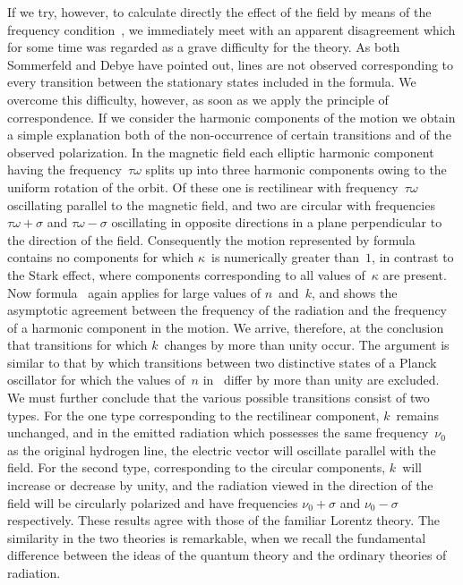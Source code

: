 If we try, however, to calculate directly the effect of the field by
means of the frequency condition~, we immediately meet with
an apparent disagreement which for some time was regarded as a
grave difficulty for the theory. As both Sommerfeld and Debye
have pointed out, lines are not observed corresponding to every
transition between the stationary states included in the formula.
We overcome this difficulty, however, as soon as we apply the
principle of correspondence. If we consider the harmonic components
of the motion we obtain a simple explanation both of the
non-occurrence of certain transitions and of the observed polarization.
In the magnetic field each elliptic harmonic component having
the frequency~$\tau\omega$ splits up into three harmonic components owing
to the uniform rotation of the orbit. Of these one is rectilinear
with frequency~$\tau\omega$ oscillating parallel to the magnetic field, and
two are circular with frequencies $\tau\omega + \sigma$ and $\tau\omega - \sigma$ oscillating in
opposite directions in a plane perpendicular to the direction of the
field. Consequently the motion represented by formula~ contains
no components for which $\kappa$~is numerically greater than~$1$, in contrast
to the Stark effect, where components corresponding to all values
of~$\kappa$ are present. Now formula~ again applies for large values
of $n$~and~$k$, and shows the asymptotic agreement between the
frequency of the radiation and the frequency of a harmonic component
in the motion. We arrive, therefore, at the conclusion that
transitions for which $k$~changes by more than unity  occur.
The argument is similar to that by which transitions between two
distinctive states of a Planck oscillator for which the values of~$n$
in~ differ by more than unity are excluded. We must further
conclude that the various possible transitions consist of two types.
For the one type corresponding to the rectilinear component, $k$~remains
unchanged, and in the emitted radiation which possesses
the same frequency~$\nu_{0}$ as the original hydrogen line, the electric
vector will oscillate parallel with the field. For the second type,
corresponding to the circular components, $k$~will increase or decrease
by unity, and the radiation viewed in the direction of the field will
be circularly polarized and have frequencies $\nu_{0} + \sigma$ and $\nu_{0} - \sigma$ respectively.
These results agree with those of the familiar Lorentz
theory. The similarity in the two theories is remarkable, when we
recall the fundamental difference between the ideas of the quantum
theory and the ordinary theories of radiation.

